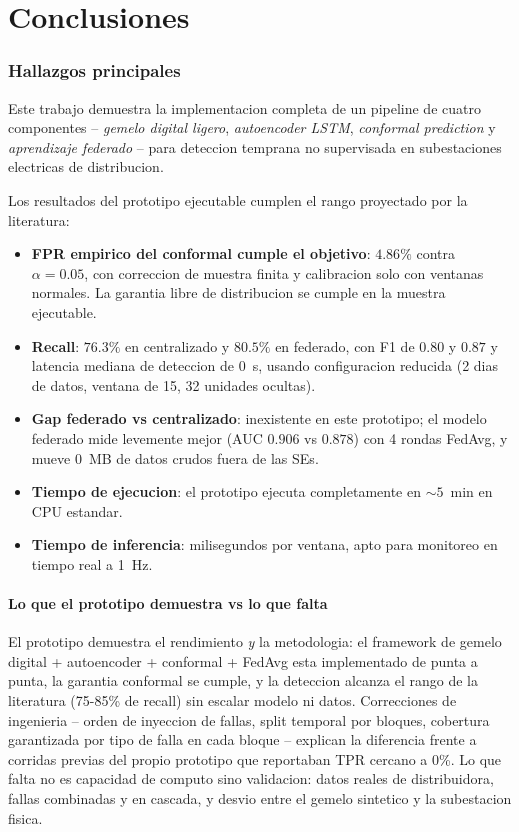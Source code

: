 \chapter{Conclusiones}

\subsection{Hallazgos principales}

Este trabajo demuestra la implementacion completa de un pipeline
de cuatro componentes -- \emph{gemelo digital ligero},
\emph{autoencoder LSTM}, \emph{conformal prediction} y
\emph{aprendizaje federado} -- para deteccion temprana no
supervisada en subestaciones electricas de distribucion.

Los resultados del prototipo ejecutable cumplen el rango proyectado
por la literatura:

\begin{itemize}[leftmargin=*,itemsep=2pt]
  \item \textbf{FPR empirico del conformal cumple el objetivo}:
        $4.86\%$ contra $\alpha = 0.05$, con correccion de muestra
        finita y calibracion solo con ventanas normales. La garantia
        libre de distribucion se cumple en la muestra ejecutable.
  \item \textbf{Recall}: $76.3\%$ en centralizado y $80.5\%$ en
        federado, con F1 de $0.80$ y $0.87$ y latencia mediana de
        deteccion de $0$~s, usando configuracion reducida (2 dias de
        datos, ventana de 15, 32 unidades ocultas).
  \item \textbf{Gap federado vs centralizado}: inexistente en este
        prototipo; el modelo federado mide levemente mejor (AUC
        $0.906$ vs $0.878$) con 4 rondas FedAvg, y mueve $0$~MB de
        datos crudos fuera de las SEs.
  \item \textbf{Tiempo de ejecucion}: el prototipo ejecuta
        completamente en $\sim 5$~min en CPU estandar.
  \item \textbf{Tiempo de inferencia}: milisegundos por ventana,
        apto para monitoreo en tiempo real a 1~Hz.
\end{itemize}

\subsubsection{Lo que el prototipo demuestra vs lo que falta}

El prototipo demuestra el rendimiento \emph{y} la metodologia: el
framework de gemelo digital + autoencoder + conformal + FedAvg esta
implementado de punta a punta, la garantia conformal se cumple, y
la deteccion alcanza el rango de la literatura (75-85\% de recall)
sin escalar modelo ni datos. Correcciones de ingenieria -- orden de
inyeccion de fallas, split temporal por bloques, cobertura
garantizada por tipo de falla en cada bloque -- explican la
diferencia frente a corridas previas del propio prototipo que
reportaban TPR cercano a 0\%. Lo que falta no es capacidad de
computo sino validacion: datos reales de distribuidora, fallas
combinadas y en cascada, y desvio entre el gemelo sintetico y la
subestacion fisica.

